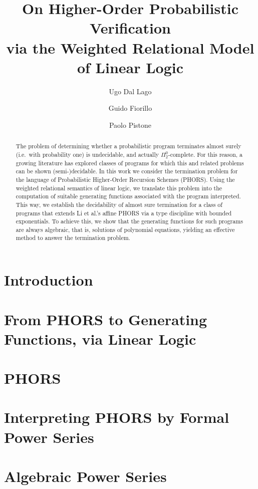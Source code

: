 \documentclass[a4paper,UKenglish,cleveref, autoref, thm-restate]{lipics-v2021}
\title{On Higher-Order Probabilistic Verification\\ via the Weighted Relational Model of Linear Logic} %
\author{Ugo Dal Lago}{University of Bologna, Italy, \and INRIA Sophia Antipolis, France }{ugo.dallago@unibo.it}{https://orcid.org/0000-0001-9200-070X}{funded by ANR-24-CE48-5521-01}%
\author{Guido Fiorillo}{Université Claude Bernard Lyon 1, France }{guido.fiorillo@ens-lyon.fr}{https://orcid.org/0009-0001-5109-6204}{funded by ANR-23-CPJ1-0054-01}
\author{Paolo Pistone}{Université Claude Bernard Lyon 1, France }{paolo.pistone@ens-lyon.fr}{https://orcid.org/0000-0003-4250-9051}{funded by ANR-23-CPJ1-0054-01}
\begin{document}
\maketitle

\begin{abstract}

The problem of determining whether a probabilistic program terminates almost surely (i.e.~with probability one) is undecidable, and actually $\Pi^0_2$-complete. 
For this reason, a growing literature has explored classes of programs for which this and related problems can be shown (semi-)decidable.
In this work we consider the termination problem for the language of Probabilistic Higher-Order Recursion Schemes (PHORS). 
Using the weighted relational semantics of linear logic, we translate this problem into the computation 
of suitable generating functions associated with the program interpreted. 
This way, we establish the decidability of almost sure termination for a class of programs that extends Li et al.'s affine PHORS via a type discipline with bounded exponentials.
To achieve this, we show that the generating functions for such programs are always algebraic, that is, solutions of polynomial equations, yielding an effective method to answer the termination problem.
\end{abstract}

\section{Introduction}



\section{From PHORS to Generating Functions, via Linear Logic}



\section{PHORS}



\section{Interpreting PHORS by Formal Power Series}



\section{Algebraic Power Series}

\end{document}

